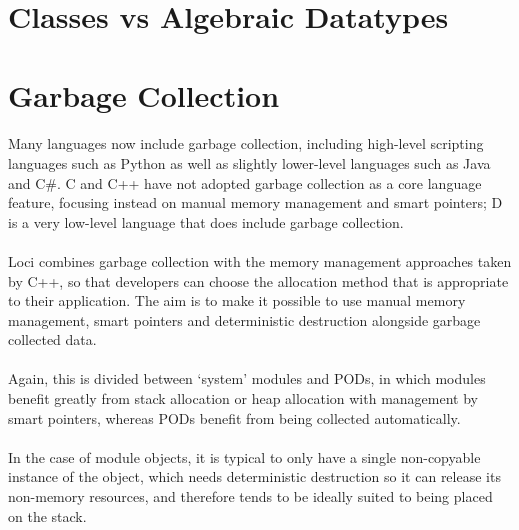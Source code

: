 \documentclass[12pt,twoside,notitlepage]{report}
\begin{document}
\section{Classes vs Algebraic Datatypes}

\paragraph{}


\section{Garbage Collection}

\paragraph{}
Many languages now include garbage collection, including high-level scripting languages such as Python as well as slightly lower-level languages such as Java and C\#. C and C++ have not adopted garbage collection as a core language feature, focusing instead on manual memory management and smart pointers; D is a very low-level language that does include garbage collection.

\paragraph{}
Loci combines garbage collection with the memory management approaches taken by C++, so that developers can choose the allocation method that is appropriate to their application. The aim is to make it possible to use manual memory management, smart pointers and deterministic destruction alongside garbage collected data.

\paragraph{}
Again, this is divided between `system' modules and PODs, in which modules benefit greatly from stack allocation or heap allocation with management by smart pointers, whereas PODs benefit from being collected automatically.

\paragraph{}
In the case of module objects, it is typical to only have a single non-copyable instance of the object, which needs deterministic destruction so it can release its non-memory resources, and therefore tends to be ideally suited to being placed on the stack.
\end{document}
